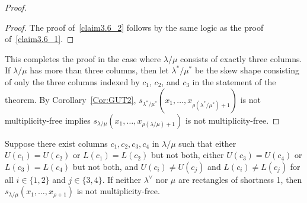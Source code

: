 \documentclass[ALCO,ThmDefs,Unicode,epreuves]{cedram}
\begin{document}
\begin{proof}
\begin{proof}
The proof of~\ref{claim3.6_2} follows by the same logic as the proof of~\ref{claim3.6_1}.
\end{proof}

This completes the proof in the case where $\lambda/\mu$ consists of exactly three columns. If $\lambda/\mu$ has more than three columns, then let $\lambda^*/\mu^*$ be the skew shape consisting of only the three columns indexed by $c_1$, $c_2$, and $c_3$ in the statement of the theorem. By Corollary~\ref{Cor:GUT2}, $s_{\lambda^*/\mu^*}(x_1,\dots, x_{\rho(\lambda^*/\mu^*) + 1})$ is not multiplicity-free implies $s_{\lambda/\mu}(x_1,\dots, x_{\rho(\lambda/\mu) + 1})$ is not multiplicity-free.
\end{proof}

\begin{prop}
\label{prop:4col}
Suppose there exist columns $c_1,c_2,c_3,c_4$ in $\lambda/\mu$ such that either $U(c_1)=U(c_2)$ or $L(c_1)=L(c_2)$ but not both, either $U(c_3)=U(c_4)$ or $L(c_3)=L(c_4)$ but not both, and $U(c_i)\not=U(c_j)$ and $L(c_i)\not=L(c_j)$ for all $i\in \{1,2\}$ and $j\in \{3,4\}$. If neither $\lambda^\vee$ nor $\mu$ are rectangles of shortness 1, then $s_{\lambda/\mu}(x_1,\ldots,x_{\rho+1})$ is not multiplicity-free.
\end{prop}
\end{document}
